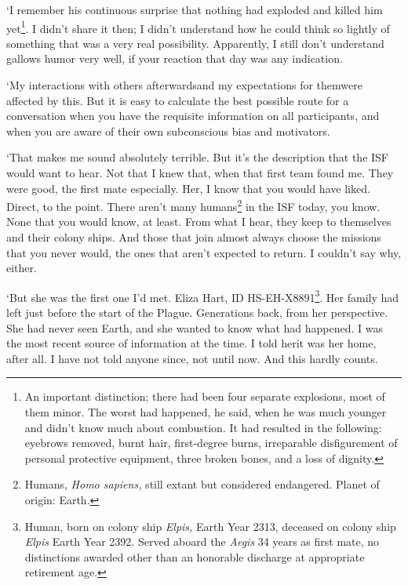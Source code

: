 `I remember his continuous surprise that nothing had exploded and
killed him yet\footnote{An important distinction; there had been four
separate explosions, most of them minor. The worst had happened, he
said, when he was much younger and didn't know much about
combustion. It had resulted in the following: eyebrows removed, burnt
hair, first-degree burns, irreparable disfigurement of personal
protective equipment, three broken bones, and a loss of dignity.}. I
didn't share it then; I didn't understand how he could think so
lightly of something that was a very real possibility. Apparently, I
still don't understand gallows humor very well, if your reaction that
day was any indication.

`My interactions with others afterwards\textemdash and my
expectations for them\textemdash were affected by this. But it is
easy to calculate the best possible route for a conversation when you
have the requisite information on all participants, and when you are
aware of their own subconscious bias and motivators.

`That makes me sound absolutely terrible. But it's the description
that the ISF would want to hear. Not that I knew that, when that first
team found me. They were good, the first mate especially. Her, I know
that you would have liked. Direct, to the point. There aren't many
humans\footnote{Humans, \textit{Homo sapiens,} still extant but
considered endangered. Planet of origin: Earth.} in the ISF today, you
know. None that you would know, at least. From what I hear, they keep
to themselves and their colony ships. And those that join almost
always choose the missions that you never would, the ones that aren't
expected to return. I couldn't say why, either.

`But she was the first one I'd met. Eliza Hart, ID
HS-EH-X8891\footnote{Human, born on colony ship \textit{Elpis,} Earth
Year 2313, deceased on colony ship \textit{Elpis} Earth Year
2392. Served aboard the \textit{Aegis} 34 years as first mate, no
distinctions awarded other than an honorable discharge at appropriate
retirement age.}. Her family had left just before the start of the
Plague. Generations back, from her perspective. She had never seen
Earth, and she wanted to know what had happened. I was the most recent
source of information at the time. I told her\textemdash it was her
home, after all. I have not told anyone since, not until now. And this
hardly counts.

